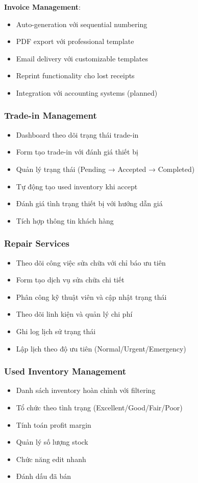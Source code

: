\documentclass[12pt,a4paper]{article}
\begin{document}
\textbf{Invoice Management}:
\begin{itemize}
    \item Auto-generation với sequential numbering
    \item PDF export với professional template
    \item Email delivery với customizable templates
    \item Reprint functionality cho lost receipts
    \item Integration với accounting systems (planned)
\end{itemize}

\subsubsection{Trade-in Management}
\begin{itemize}
    \item Dashboard theo dõi trạng thái trade-in
    \item Form tạo trade-in với đánh giá thiết bị
    \item Quản lý trạng thái (Pending → Accepted → Completed)
    \item Tự động tạo used inventory khi accept
    \item Đánh giá tình trạng thiết bị với hướng dẫn giá
    \item Tích hợp thông tin khách hàng
\end{itemize}

\subsubsection{Repair Services}
\begin{itemize}
    \item Theo dõi công việc sửa chữa với chỉ báo ưu tiên
    \item Form tạo dịch vụ sửa chữa chi tiết
    \item Phân công kỹ thuật viên và cập nhật trạng thái
    \item Theo dõi linh kiện và quản lý chi phí
    \item Ghi log lịch sử trạng thái
    \item Lập lịch theo độ ưu tiên (Normal/Urgent/Emergency)
\end{itemize}

\subsubsection{Used Inventory Management}
\begin{itemize}
    \item Danh sách inventory hoàn chỉnh với filtering
    \item Tổ chức theo tình trạng (Excellent/Good/Fair/Poor)
    \item Tính toán profit margin
    \item Quản lý số lượng stock
    \item Chức năng edit nhanh
    \item Đánh dấu đã bán
\end{itemize}
\end{document}
